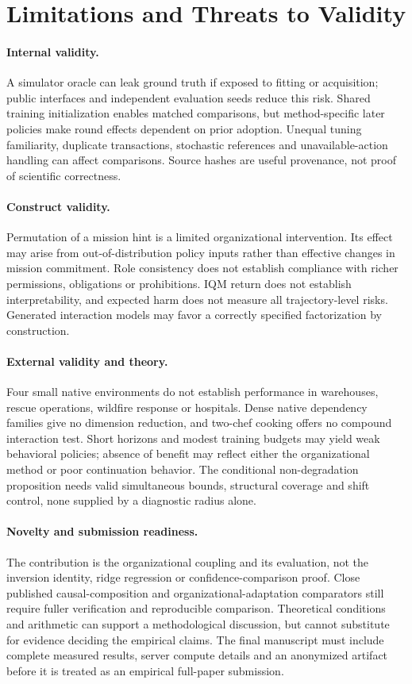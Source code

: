 \documentclass[runningheads]{llncs}
\begin{document}
\section{Limitations and Threats to Validity}\label{sec:limitations}
\paragraph{Internal validity.}
A simulator oracle can leak ground truth if exposed to fitting or acquisition; public interfaces and independent evaluation seeds reduce this risk. Shared training initialization enables matched comparisons, but method-specific later policies make round effects dependent on prior adoption. Unequal tuning familiarity, duplicate transactions, stochastic references and unavailable-action handling can affect comparisons. Source hashes are useful provenance, not proof of scientific correctness.

\paragraph{Construct validity.}
Permutation of a mission hint is a limited organizational intervention. Its effect may arise from out-of-distribution policy inputs rather than effective changes in mission commitment. Role consistency does not establish compliance with richer permissions, obligations or prohibitions. IQM return does not establish interpretability, and expected harm does not measure all trajectory-level risks. Generated interaction models may favor a correctly specified factorization by construction.

\paragraph{External validity and theory.}
Four small native environments do not establish performance in warehouses, rescue operations, wildfire response or hospitals. Dense native dependency families give no dimension reduction, and two-chef cooking offers no compound interaction test. Short horizons and modest training budgets may yield weak behavioral policies; absence of benefit may reflect either the organizational method or poor continuation behavior. The conditional non-degradation proposition needs valid simultaneous bounds, structural coverage and shift control, none supplied by a diagnostic radius alone.

\paragraph{Novelty and submission readiness.}
The contribution is the organizational coupling and its evaluation, not the inversion identity, ridge regression or confidence-comparison proof. Close published causal-composition and organizational-adaptation comparators still require fuller verification and reproducible comparison. Theoretical conditions and arithmetic can support a methodological discussion, but cannot substitute for evidence deciding the empirical claims. The final manuscript must include complete measured results, server compute details and an anonymized artifact before it is treated as an empirical full-paper submission.
\end{document}
